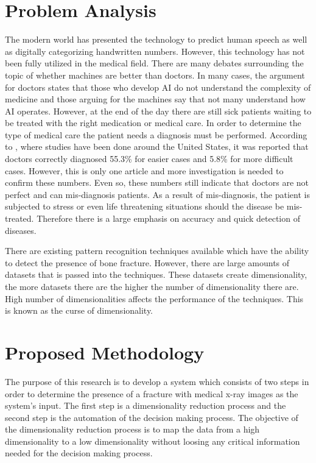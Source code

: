 \documentclass[11pt,twocolumn]{witseiepaper}
\begin{document}
	\section{Problem Analysis}
	The modern world has presented the technology to predict human speech as well as digitally categorizing handwritten numbers. However, this technology has not been fully utilized in the medical field. There are many debates surrounding the topic of whether machines are better than doctors. In many cases, the argument for doctors states that those who develop AI do not understand the complexity of medicine and those arguing for the machines say that not many understand how AI operates. However, at the end of the day there are still sick patients waiting to be treated with the right medication or medical care. In order to determine the type of medical care the patient needs a diagnosis must be performed. According to \cite{meyer_physicians_2013}, where studies have been done around the United States, it was reported that doctors correctly diagnosed 55.3\% for easier cases and 5.8\% for more difficult cases. However, this is only one article and more investigation is needed to confirm these numbers. Even so, these numbers still indicate that doctors are not perfect and can mis-diagnosis patients. As a result of mis-diagnosis, the patient is subjected to stress or even life threatening situations should the disease be mis-treated. Therefore there is a large emphasis on accuracy and quick detection of diseases.
	
	There are existing pattern recognition techniques available which have the ability to detect the presence of bone fracture. However, there are large amounts of datasets that is passed into the techniques. These datasets create dimensionality, the more datasets there are the higher the number of dimensionality there are. High number of dimensionalities affects the performance of the techniques. This is known as the curse of dimensionality. 
	
	\section{Proposed Methodology}
	The purpose of this research is to develop a system which consists of two steps in order to determine the presence of a fracture with medical x-ray images as the system's input. The first step is a dimensionality reduction process and the second step is the automation of the decision making process. The objective of the dimensionality reduction process is to map the data from a high dimensionality to a low dimensionality without loosing any critical information needed for the decision making process. 
	
\end{document}
